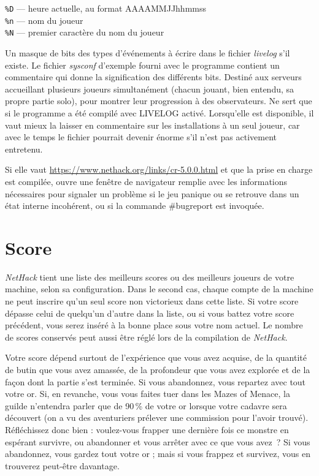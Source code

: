 \documentclass[titlepage]{article}
\begin{document}
\begin{description}[font=\mdseries\itshape]
\texttt{\%D}  --- heure actuelle, au format AAAAMMJJhhmmss\\
\texttt{\%n}  --- nom du joueur\\
\texttt{\%N}  --- premier caractère du nom du joueur
\item[LIVELOG]
Un masque de bits des types d'événements à écrire dans
le fichier \textit{livelog} s'il existe.
Le fichier \textit{sysconf} d'exemple fourni avec le programme contient un
commentaire qui donne la signification des différents bits.
Destiné aux serveurs accueillant plusieurs joueurs simultanément
(chacun jouant, bien entendu, sa propre partie solo),
pour montrer leur progression à des observateurs.
Ne sert que si le programme a été compilé avec LIVELOG activé.
Lorsqu'elle est disponible, il vaut mieux la laisser en commentaire sur les
installations à un seul joueur, car avec le temps le fichier pourrait devenir
énorme s'il n'est pas activement entretenu.
\item[CRASHREPORTURL]
Si elle vaut
\url{https://www.nethack.org/links/cr-5.0.0.html}
et que la prise en charge est compilée, ouvre une fenêtre de navigateur remplie avec
les informations nécessaires pour signaler un problème si le jeu panique ou se
retrouve dans un état interne incohérent, ou si la commande \#bugreport est
invoquée.
\end{description}

\section{Score}

\textit{NetHack} tient une liste des meilleurs scores ou des meilleurs joueurs de votre
machine, selon sa configuration.  Dans le second cas, chaque compte de
la machine ne peut inscrire qu'un seul score non victorieux dans cette liste.  Si
votre score dépasse celui de quelqu'un d'autre dans la liste, ou si vous battez votre
score précédent, vous serez inséré à la bonne place sous votre
nom actuel.  Le nombre de scores conservés peut aussi être réglé lors de
la compilation de \textit{NetHack}.

Votre score dépend surtout de l'expérience que vous avez acquise, de la quantité
de butin que vous avez amassée, de la profondeur que vous avez explorée et de la
façon dont la partie s'est terminée.  Si vous abandonnez, vous repartez avec tout
votre or.
Si, en revanche, vous vous faites tuer dans les Mazes of Menace, la guilde
n'entendra parler que de 90\,\% de votre or lorsque votre cadavre sera découvert
(on a vu des aventuriers prélever une commission pour l'avoir trouvé).  Réfléchissez donc
bien : voulez-vous frapper une dernière fois ce monstre en espérant
survivre, ou abandonner et vous arrêter avec ce que vous avez~?  Si vous abandonnez,
vous gardez tout votre or ; mais si vous frappez et survivez, vous en trouverez peut-être davantage.
\end{document}
